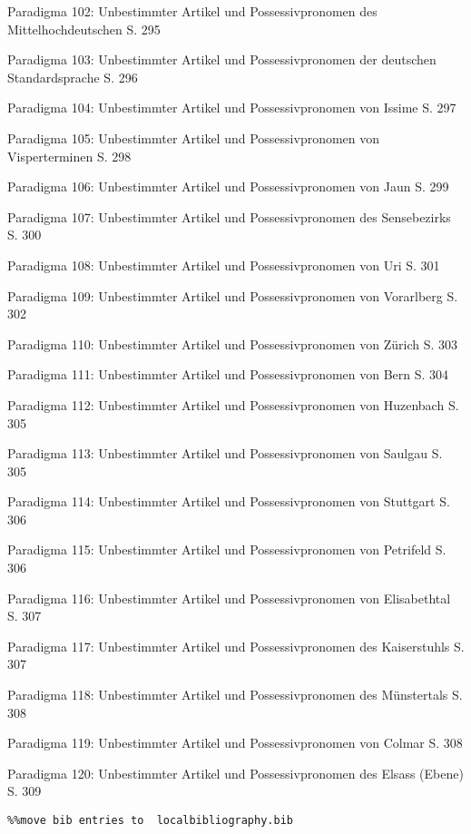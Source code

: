 Paradigma 102: Unbestimmter Artikel und Possessivpronomen des Mittelhochdeutschen \citep[216–217, 231]{Paul2007}  S. 295

Paradigma 103: Unbestimmter Artikel und Possessivpronomen der deutschen Standardsprache \citep[169–177]{Eisenberg2006}  S. 296

Paradigma 104: Unbestimmter Artikel und Possessivpronomen von Issime \citep[13–16, 82–84]{Perinetto1981}  S. 297

Paradigma 105: Unbestimmter Artikel und Possessivpronomen von Visperterminen \citep[137, 144]{Wipf1911}  S. 298

Paradigma 106: Unbestimmter Artikel und Possessivpronomen von Jaun \citep[277–278, 284–285]{Stucki1917}  S. 299

Paradigma 107: Unbestimmter Artikel und Possessivpronomen des Sensebezirks \citep[194, 198–199]{Henzen1927}  S. 300

Paradigma 108: Unbestimmter Artikel und Possessivpronomen von Uri \citep[189, 193–194]{Clauß1929}  S. 301

Paradigma 109: Unbestimmter Artikel und Possessivpronomen von Vorarlberg \citep[269–270, 274–276]{Jutz1925}  S. 302

Paradigma 110: Unbestimmter Artikel und Possessivpronomen von Zürich \citep[104–107, 135–139]{Weber1987}  S. 303

Paradigma 111: Unbestimmter Artikel und Possessivpronomen von Bern \citep[79, 98–101]{Marti1985}  S. 304

Paradigma 112: Unbestimmter Artikel und Possessivpronomen von Huzenbach \citep[101, 104]{Baur1967}  S. 305

Paradigma 113: Unbestimmter Artikel und Possessivpronomen von Saulgau \citep[116–119]{Raichle1932}  S. 305

Paradigma 114: Unbestimmter Artikel und Possessivpronomen von Stuttgart \citep[156]{Frey1975}  S. 306

Paradigma 115: Unbestimmter Artikel und Possessivpronomen von Petrifeld \citep[64–66]{Moser1937}  S. 306

Paradigma 116: Unbestimmter Artikel und Possessivpronomen von Elisabethtal \citep[52]{Žirmunskij1928/29}  S. 307

Paradigma 117: Unbestimmter Artikel und Possessivpronomen des Kaiserstuhls \citep[376, 380–384]{Noth1993}  S. 307

Paradigma 118: Unbestimmter Artikel und Possessivpronomen des Münstertals \citep[45–47]{Mankel1886}  S. 308

Paradigma 119: Unbestimmter Artikel und Possessivpronomen von Colmar \citep[70–71, 84–85]{Henry1900}  S. 308

Paradigma 120: Unbestimmter Artikel und Possessivpronomen des Elsass (Ebene) \citep[78–83, 98–109]{Beyer1963}  S. 309


\begin{verbatim}%%move bib entries to  localbibliography.bib
\end{verbatim}